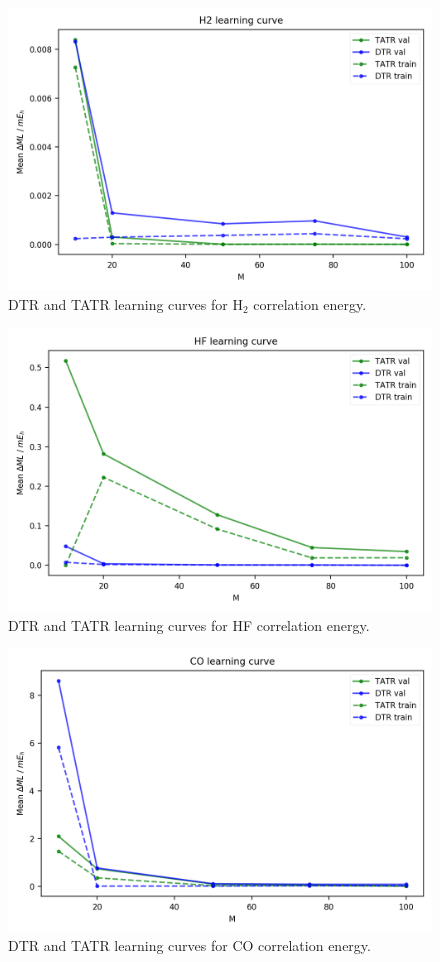 \begin{figure}
    \centering
    \includegraphics[scale=1.0]{p2/figures/si/H2_learn_e.png}
    \caption{DTR and TATR learning curves for H$_2$ correlation energy.}
\end{figure}

\begin{figure}
    \centering
    \includegraphics[scale=1.0]{p2/figures/si/HF_learn_e.png}
    \caption{DTR and TATR learning curves for HF correlation energy.}
\end{figure}

\begin{figure}
    \centering
    \includegraphics[scale=1.0]{p2/figures/si/CO_learn_e.png}
    \caption{DTR and TATR learning curves for CO correlation energy.}
\end{figure}

